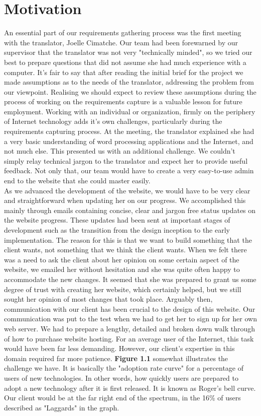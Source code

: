 \documentclass{l3proj}
\begin{document}
\section{Motivation}
An essential part of our requirements gathering process was the first meeting with the translator, Joelle Cimatche. Our team had been forewarned by our supervisor that the translator was not very "technically minded", so we tried our best to prepare questions that did not assume she had much experience with a computer. It's fair to say that after reading the initial brief for the project we made assumptions as to the needs of the translator, addressing the problem from our viewpoint. Realising we should expect to review these assumptions during the process of working on the requirements capture is a valuable lesson for future employment. Working with an individual or organization, firmly on the periphery of Internet technology adds it's own challenges, particularly during the requirements capturing process. At the meeting, the translator explained she had a very basic understanding of word processing applications and the Internet, and not much else. This presented us with an additional challenge. We couldn't simply relay technical jargon to the translator and expect her to provide useful feedback. Not only that, our team would have to create a very easy-to-use admin end to the website that she could master easily.\\

As we advanced the development of the website, we would have to be very clear and straightforward when updating her on our progress. We accomplished this mainly through emails containing concise, clear and jargon free status updates on the website progress. These updates had been sent at important stages of development such as the transition from the design inception to the early implementation. The reason for this is that we want to build something that the client wants, not something that we think the client wants. When we felt there was a need to ask the client about her opinion on some certain aspect of the website, we emailed her without hesitation and she was quite often happy to accommodate the new changes. It seemed that she was prepared to grant us some degree of trust with creating her website, which certainly helped, but we still sought her opinion of most changes that took place. Arguably then, communication with our client has been crucial to the design of this website. Our communication was put to the test when we had to get her to sign up for her own web server. We had to prepare a lengthy, detailed and broken down walk through of how to purchase website hosting. For an average user of the Internet, this task would have been far less demanding. However, our client's expertise in this domain required far more patience. \textbf{Figure 1.1} somewhat illustrates the challenge we have. It is basically the "adoption rate curve" for a percentage of users of new technologies. In other words, how quickly users are prepared to adopt a new technology after it is first released. It is known as Roger's bell curve. Our client would be at the far right end of the spectrum, in the 16\% of users described as "Laggards" in the graph.\\
	
\end{document}
